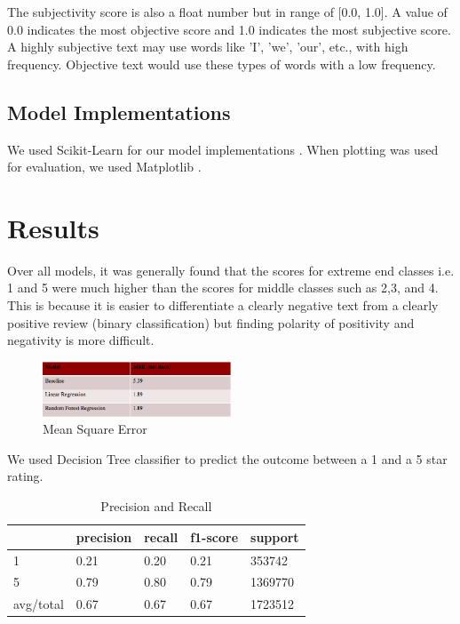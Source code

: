 \documentclass[12pt]{article}
\begin{document}
The subjectivity score is also a float number but in range of [0.0, 1.0]. A value of 0.0
indicates the most objective score and 1.0 indicates the most subjective score. A highly
subjective text may use words like 'I', 'we', 'our', etc., with high frequency. Objective
text would use these types of words with a low frequency.

\subsection{Model Implementations}

We used Scikit-Learn for our model implementations \cite{sklearnl76:online, 32432skl20:online,
  sklearnt25:online}. When plotting was used for evaluation, we used
Matplotlib \cite{Matplotl1:online}. 

\section{Results}

Over all models, it was generally found that the scores for extreme end classes i.e. 1 and 5 
were much higher than the scores for middle classes such as 2,3, and 4. This is because it is 
easier to differentiate a clearly negative text from a clearly positive review (binary classification)
but finding polarity of positivity and negativity is more difficult.

\begin{figure}[h]
  \caption{Mean Square Error}
  \centering
  \includegraphics[width=0.5\textwidth]{MSE}
  \end{figure}
  
  We used Decision Tree classifier to predict the outcome between a 1 and a 5 star rating.
  
  \begin{table}[h]
	\caption{Precision and Recall}
	\begin{tabular}{|l|l|l|l|l|}
	\hline
    \textbf{} & \textbf{precision} & \textbf{recall} & \textbf{f1-score} & \textbf{support} \\
	\hline 
	1         & 0.21      & 0.20   & 0.21     & 353742  \\
	\hline 
	5         & 0.79      & 0.80   & 0.79     & 1369770 \\
 	\hline 
 	avg/total & 0.67      & 0.67   & 0.67     & 1723512 \\
 	\hline
\end{tabular}
\end{table}
\end{document}
